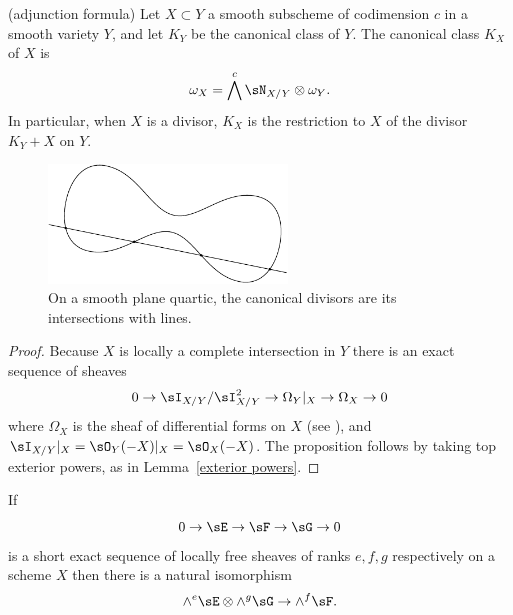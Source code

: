 \begin{proposition}\label{adjunction}(adjunction formula)
 Let $X\subset Y$ a smooth subscheme of codimension $c$ in a smooth variety $Y$, and let $K_{Y}$ be the canonical class of $Y$. The canonical class $K_X$ of $X$ is 
 $$
 \omega_{X} = \bigwedge^{c} \sN_{X/Y} \otimes \omega_{Y}.
 $$
In particular, when $X$ is a divisor, $K_{X}$ is the restriction to $X$ of the divisor $K_{Y}+X$ on $Y$.
\end{proposition}

\begin{figure}
\centerline{\includegraphics[width=2.5in]{"main/Fig02-1"}}
\caption{On a smooth plane quartic, the canonical divisors are its intersections with lines.}
\end{figure}


\begin{proof}
 Because $X$ is locally a complete intersection in $Y$ there is an exact sequence of sheaves
 $$
0\to  \sI_{X/Y}/\sI_{X/Y}^{2} \to \Omega_{Y}| _{X} \to \Omega_{X} \to 0
 $$
 where $\Omega_{X}$ is the sheaf of differential forms on $X$ (see \cite[Proposition 16.3]{Eisenbud95}), and
$ \sI_{X/Y}|_{X} = \sO_{Y}(-X)|_{X} = \sO_{X}(-X)$. The proposition follows by taking top exterior powers, 
as in Lemma~\ref{exterior powers}.\end{proof}

\begin{lemma}\label{exterior powers}
 If 
$$
0\to \sE \to \sF\to \sG \to 0
$$
is a short exact sequence of locally free sheaves of ranks $e,f,g$ respectively on a scheme $X$ then there is a natural
isomorphism 
$$
\wedge^e\sE \otimes \wedge^g \sG \to \wedge^f\sF.
$$
\end{lemma}

